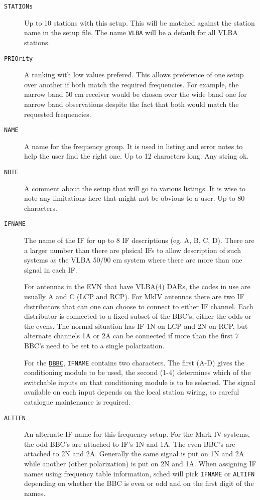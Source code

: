 \documentclass{report}
\begin{document}
\begin{description}

\item [{\tt STATIONs}] Up to 10 stations with this setup.  This will
be matched against the station name in the setup file.  The name
{\tt VLBA} will be a default for all VLBA stations.

\item [{\tt PRIOrity}] A ranking with low values prefered.  This
allows preference of one setup over another if both match the
required frequencies.  For example, the narrow band 50 cm receiver
would be chosen over the wide band one for narrow band observations
despite the fact that both would match the requested frequencies.

\item [{\tt NAME}] A name for the frequency group.  It is used
in listing and error notes to help the user find the right one.
Up to 12 characters long.  Any string ok.

\item [{\tt NOTE}]  A comment about the setup that will go to
various listings.  It is wise to note any limitations here that
might not be obvious to a user.  Up to 80 characters.

\item [{\tt IFNAME}\label{FQ:IFNAME}] The name of the IF for up to 8 IF
descriptions (eg. A, B, C, D).  There are a larger number than there are
phsical IFs to allow description of such systems as the VLBA 50/90 cm
system where there are more than one signal in each IF.

For antennas in the EVN that have VLBA(4) DARs, the codes in use are
usually A and C (LCP and RCP). For MkIV antennas there are two IF
distributors that can one can choose to connect to either IF channel.
Each distributor is connected to a fixed subset of the BBC's, either
the odds or the evens.  The normal situation has IF 1N on LCP and 2N
on RCP, but alternate channels 1A or 2A can be connected if more than
the first 7 BBC's need to be set to a single polarization.

For the 
{\hyperref[SSEC:DBBC]{{\tt DBBC}}}, {\tt IFNAME} contains two
characters. The first (A-D) gives the conditioning module to be used,
the second (1-4) determines which of the switchable inputs on that
conditioning module is to be selected. The signal available on each
input depends on the local station wiring, so careful catalogue
maintenance is required.

\item[{\tt ALTIFN}]  An alternate IF name for this frequency setup.
For the Mark IV systems, the odd BBC's are attached to IF's 1N and
1A.  The even BBC's are attached to 2N and 2A.  Generally the
same signal is put on 1N and 2A while another (other polarization)
is put on 2N and 1A.  When assigning IF names using frequency table
information, sched will pick {\tt IFNAME} or {\tt ALTIFN} depending
on whether the BBC is even or odd and on the first digit of the
names.


\end{description}
\end{document}
